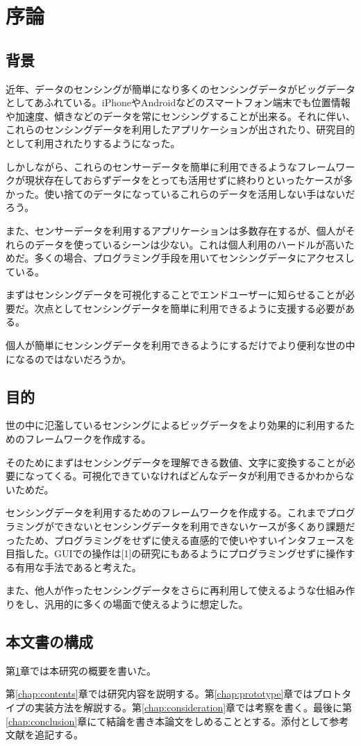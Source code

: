 \chapter{序論}
\label{chap:introduction}
\section{背景}
近年、データのセンシングが簡単になり多くのセンシングデータがビッグデータとしてあふれている。iPhoneやAndroidなどのスマートフォン端末でも位置情報や加速度、傾きなどのデータを常にセンシングすることが出来る。それに伴い、これらのセンシングデータを利用したアプリケーションが出されたり、研究目的として利用されたりするようになった。

しかしながら、これらのセンサーデータを簡単に利用できるようなフレームワークが現状存在しておらずデータをとっても活用せずに終わりといったケースが多かった。使い捨てのデータになっているこれらのデータを活用しない手はないだろう。

また、センサーデータを利用するアプリケーションは多数存在するが、個人がそれらのデータを使っているシーンは少ない。これは個人利用のハードルが高いためだ。多くの場合、プログラミング手段を用いてセンシングデータにアクセスしている。

まずはセンシングデータを可視化することでエンドユーザーに知らせることが必要だ。次点としてセンシングデータを簡単に利用できるように支援する必要がある。

個人が簡単にセンシングデータを利用できるようにするだけでより便利な世の中になるのではないだろうか。

\section{目的}
世の中に氾濫しているセンシングによるビッグデータをより効果的に利用するためのフレームワークを作成する。

そのためにまずはセンシングデータを理解できる数値、文字に変換することが必要になってくる。可視化できていなければどんなデータが利用できるかわからないためだ。

センシングデータを利用するためのフレームワークを作成する。これまでプログラミングができないとセンシングデータを利用できないケースが多くあり課題だったため、プログラミングをせずに使える直感的で使いやすいインタフェースを目指した。GUIでの操作は[1]の研究にもあるようにプログラミングせずに操作する有用な手法であると考えた。

また、他人が作ったセンシングデータをさらに再利用して使えるような仕組み作りをし、汎用的に多くの場面で使えるように想定した。

\section{本文書の構成}
第\ref{chap:introduction}章では本研究の概要を書いた。

第\ref{chap:contents}章では研究内容を説明する。第\ref{chap:prototype}章ではプロトタイプの実装方法を解説する。第\ref{chap:consideration}章では考察を書く。最後に第\ref{chap:conclusion}章にて結論を書き本論文をしめることとする。添付として参考文献を追記する。
